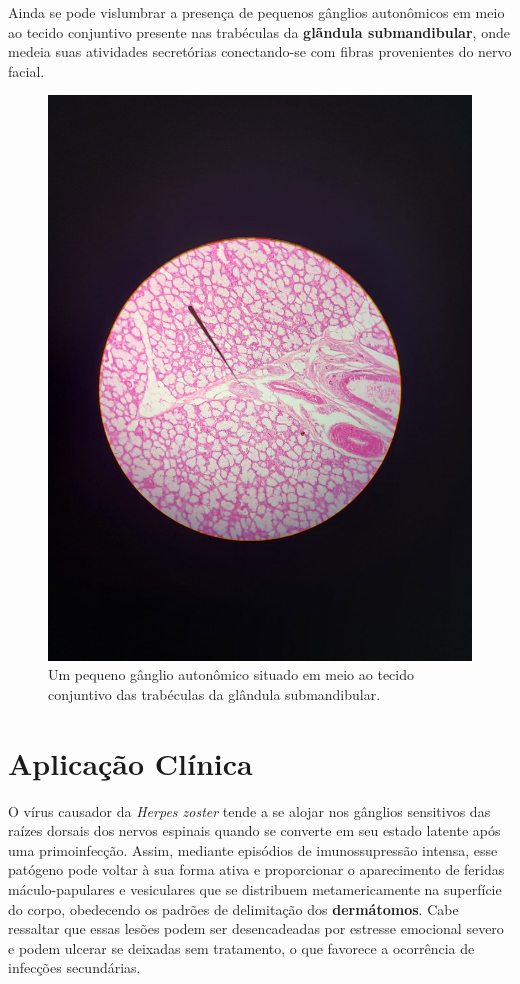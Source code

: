 \documentclass[
]{book}
\begin{document}
Ainda se pode vislumbrar a presença de pequenos gânglios autonômicos em meio ao tecido conjuntivo presente nas trabéculas da \textbf{glãndula submandibular}, onde medeia suas atividades secretórias conectando-se com fibras provenientes do nervo facial.

\begin{figure}
\centering
\includegraphics{images/neuro-ganglio.jpeg}
\caption{\label{fig:unnamed-chunk-13}Um pequeno gânglio autonômico situado em meio ao tecido conjuntivo das trabéculas da glândula submandibular.}
\end{figure}

\hypertarget{aplicauxe7uxe3o-cluxednica}{%
\section{Aplicação Clínica}\label{aplicauxe7uxe3o-cluxednica}}

O vírus causador da \emph{Herpes zoster} tende a se alojar nos gânglios sensitivos das raízes dorsais dos nervos espinais quando se converte em seu estado latente após uma primoinfecção. Assim, mediante episódios de imunossupressão intensa, esse patógeno pode voltar à sua forma ativa e proporcionar o aparecimento de feridas máculo-papulares e vesiculares que se distribuem metamericamente na superfície do corpo, obedecendo os padrões de delimitação dos \textbf{dermátomos}. Cabe ressaltar que essas lesões podem ser desencadeadas por estresse emocional severo e podem ulcerar se deixadas sem tratamento, o que favorece a ocorrência de infecções secundárias.
\end{document}
